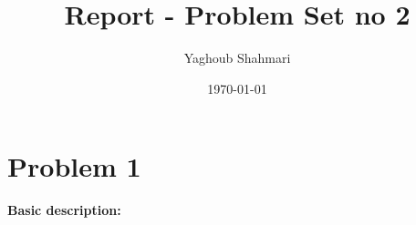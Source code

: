 \documentclass{article}
\author{Yaghoub Shahmari}
\title{Report - Problem Set no 2}
\date{\today}
\begin{document}
    \maketitle
    \section*{Problem 1}
    \textbf{Basic description:}
\end{document}
